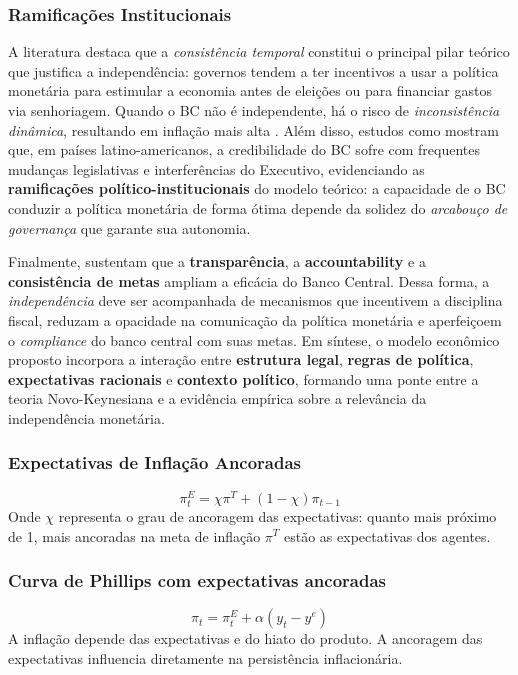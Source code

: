 \documentclass[a4paper,12pt]{article}[abnt2]
\begin{document}
\subsubsection{\textbf{Ramificações Institucionais}}
A literatura destaca que a \emph{consistência temporal} constitui o principal pilar teórico que justifica a independência: governos tendem a ter incentivos a usar a política monetária para estimular a economia antes de eleições ou para financiar gastos via senhoriagem. Quando o BC não é independente, há o risco de \emph{inconsistência dinâmica}, resultando em inflação mais alta \cite{acemoglu2008}. Além disso, estudos como \cite{jacome2022} mostram que, em países latino-americanos, a credibilidade do BC sofre com frequentes mudanças legislativas e interferências do Executivo, evidenciando as \textbf{ramificações político-institucionais} do modelo teórico: a capacidade de o BC conduzir a política monetária de forma ótima depende da solidez do \emph{arcabouço de governança} que garante sua autonomia.

Finalmente, \cite{unsal2023} sustentam que a \textbf{transparência}, a \textbf{accountability} e a \textbf{consistência de metas} ampliam a eficácia do Banco Central. Dessa forma, a \emph{independência} deve ser acompanhada de mecanismos que incentivem a disciplina fiscal, reduzam a opacidade na comunicação da política monetária e aperfeiçoem o \emph{compliance} do banco central com suas metas. Em síntese, o modelo econômico proposto incorpora a interação entre \textbf{estrutura legal}, \textbf{regras de política}, \textbf{expectativas racionais} e \textbf{contexto político}, formando uma ponte entre a teoria Novo-Keynesiana e a evidência empírica sobre a relevância da independência monetária. 

\subsubsection{\textbf{Expectativas de Inflação Ancoradas}}
\begin{equation}
\pi_t^E = \chi \pi^T + (1 - \chi)\pi_{t-1}
\end{equation}
\noindent Onde $\chi$ representa o grau de ancoragem das expectativas: quanto mais próximo de 1, mais ancoradas na meta de inflação $\pi^T$ estão as expectativas dos agentes.

\subsubsection{\textbf{Curva de Phillips com expectativas ancoradas}}
\begin{equation}
\pi_t = \pi_t^E + \alpha (y_t - y^e)
\end{equation}
\noindent A inflação depende das expectativas e do hiato do produto. A ancoragem das expectativas influencia diretamente na persistência inflacionária.
\end{document}
